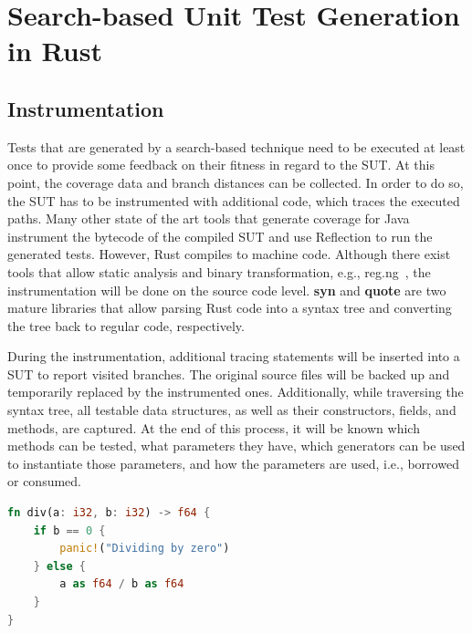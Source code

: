 \documentclass[paper=a4,%
  twoside,%
  BCOR4mm,%
  abstract=true,%
  toc=bibliography,%
  chapterprefix=true,%
  toc=bibliographynumbered,%
  open=right,%
  english,%
  pagesize=pdftex]{scrreprt}
\begin{document}
\clearpage
\chapter{Search-based Unit Test Generation in Rust}
\label{chap:sbst-in-rust}

\section{Instrumentation}
Tests that are generated by a search-based technique need to be executed at least once to provide some feedback on their fitness in regard to the \ac{SUT}. At this point, the coverage data and branch distances can be collected. In order to do so, the \ac{SUT} has to be instrumented with additional code, which traces the executed paths. Many other state of the art tools that generate coverage for Java instrument the bytecode of the compiled \ac{SUT} and use Reflection to run the generated tests. However, Rust compiles to machine code. Although there exist tools that allow static analysis and binary transformation, e.g., reg.ng~\cite{DiFederico2018}, the instrumentation will be done on the source code level. \textbf{syn} and \textbf{quote} are two mature libraries that allow parsing Rust code into a syntax tree and converting the tree back to regular code, respectively.

During the instrumentation, additional tracing statements will be inserted into a \ac{SUT} to report visited branches. The original source files will be backed up and temporarily replaced by the instrumented ones. Additionally, while traversing the syntax tree, all testable data structures, as well as their constructors, fields, and methods, are captured. At the end of this process, it will be known which methods can be tested, what parameters they have, which generators can be used to instantiate those parameters, and how the parameters are used, i.e., borrowed or consumed.

\begin{lstlisting}[language=Rust, style=boxed, caption=Division by zero transformation, label=lst:example-testability-transformation]
fn div(a: i32, b: i32) -> f64 {
    if b == 0 {
        panic!("Dividing by zero")
    } else {
        a as f64 / b as f64
    }
}
\end{lstlisting}
\end{document}
